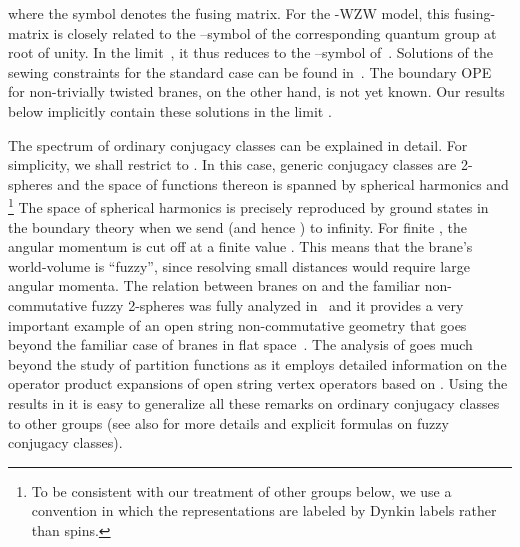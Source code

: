 \documentclass[12pt,a4paper]{article}
\providecommand{\mf}{\mathfrak} %
\def\asg{{\hat{\mf{g}}}}
\def\id{{\rm id}}
\def\a{\alpha}
\begin{document}
where the symbol \coordHE{} denotes the fusing matrix. For
the \myHighlight{$\asg_k$}\coordHE{}-WZW model, this fusing-matrix is closely related 
to the \coordHE{}--symbol of the corresponding quantum group at 
\coordHE{} root of unity. In the limit~\coordHE{}, it 
thus reduces to the \coordHE{}--symbol of~\myHighlight{$\mf{g}$}\coordHE{}. Solutions of 
the sewing constraints for the standard case \myHighlight{$\omega_G = \id$}\coordHE{} 
can be found in~\cite{Runkel:1998pm, Alekseev:1999bs, Felder:1999ka, 
Behrend:1999bn}. The boundary OPE for non-trivially twisted 
branes, on the other hand, is not yet known. Our results
below implicitly contain these solutions in the limit 
\coordHE{}.  
\medskip

The spectrum of ordinary conjugacy classes can be explained 
in detail. For simplicity, we shall restrict to 
\coordHE{}. In this case, generic conjugacy classes are 
2-spheres and the space of functions thereon is spanned 
by spherical harmonics \coordHE{} and \coordHE{}\footnote{To be consistent with our 
treatment of other groups below, we use a convention in which 
the representations are labeled by Dynkin labels rather than spins.}  
The space of spherical harmonics is precisely 
reproduced by ground states in the boundary theory 
\myHighlight{$\alpha$}\coordHE{} when we send \myHighlight{$\a$}\coordHE{} (and hence \coordHE{}) to infinity. 
For finite \myHighlight{$\a$}\coordHE{}, the angular momentum \coordHE{} is cut off at a 
finite value \myHighlight{$j = \min(2\a, 2k-2\a) \leq 2 \a$}\coordHE{}. This means
that the brane's world-volume is ``fuzzy'', since resolving 
small distances would require large angular momenta. The
relation between branes on \coordHE{} and the familiar non-%
commutative fuzzy 2-spheres \cite{Hoppe:1989gk, Madore:1992bw}
was fully analyzed 
in~\cite{Alekseev:1999bs} and it provides a very important  
example of an open string non-commutative geometry that goes 
beyond the familiar case of branes in flat space~\cite{Douglas:1998fm,
Chu:1998qz, Schomerus:1999ug}. 
The analysis of \cite{Alekseev:1999bs} goes much beyond the study
of partition functions as it employs detailed information
on the operator product expansions of open string vertex
operators based on \cite{Runkel:1998pm}. Using the results in 
\cite{Felder:1999ka, Felder:1999cv, Felder:1999mq} it is
easy to generalize all these remarks 
on ordinary conjugacy classes to other groups (see also 
\cite{Hoppe:1989gk} for more details and explicit formulas on 
fuzzy conjugacy classes).  
\smallskip
\end{document}

